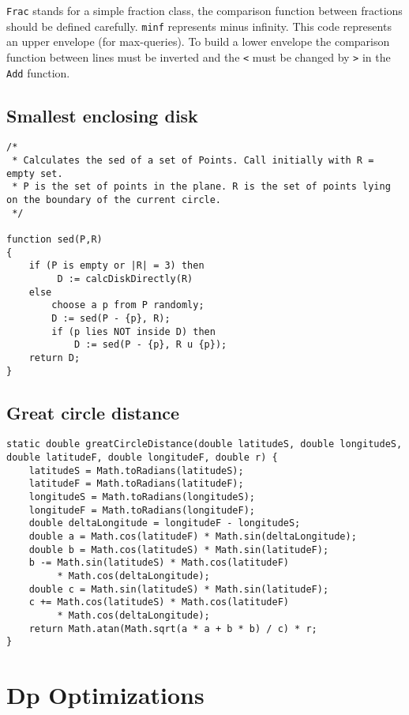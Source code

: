 \documentclass[10pt,letterpaper,twocolumn,twosided]{article}
\begin{document}
\verb+Frac+ stands for a simple fraction class, the comparison function between fractions should be defined carefully. \verb+minf+ represents minus infinity. This code represents an upper envelope (for max-queries). To build a lower envelope the comparison function between lines must be inverted and the \verb+<+ must be changed by \verb+>+  in the \verb+Add+ function.

\subsection{Smallest enclosing disk}

\begin{lstlisting}
/*
 * Calculates the sed of a set of Points. Call initially with R = empty set.
 * P is the set of points in the plane. R is the set of points lying on the boundary of the current circle.
 */

function sed(P,R) 
{
    if (P is empty or |R| = 3) then
         D := calcDiskDirectly(R)
    else
        choose a p from P randomly;
        D := sed(P - {p}, R);
        if (p lies NOT inside D) then
            D := sed(P - {p}, R u {p});
    return D;
}
\end{lstlisting}

\subsection{Great circle distance}

\begin{lstlisting}
static double greatCircleDistance(double latitudeS, double longitudeS, double latitudeF, double longitudeF, double r) {
	latitudeS = Math.toRadians(latitudeS);
	latitudeF = Math.toRadians(latitudeF);
	longitudeS = Math.toRadians(longitudeS);
	longitudeF = Math.toRadians(longitudeF);
	double deltaLongitude = longitudeF - longitudeS;
	double a = Math.cos(latitudeF) * Math.sin(deltaLongitude);
	double b = Math.cos(latitudeS) * Math.sin(latitudeF);
	b -= Math.sin(latitudeS) * Math.cos(latitudeF) 
         * Math.cos(deltaLongitude);
	double c = Math.sin(latitudeS) * Math.sin(latitudeF);
	c += Math.cos(latitudeS) * Math.cos(latitudeF) 
         * Math.cos(deltaLongitude);
	return Math.atan(Math.sqrt(a * a + b * b) / c) * r;
}
\end{lstlisting}


\section{Dp Optimizations}
\end{document}
